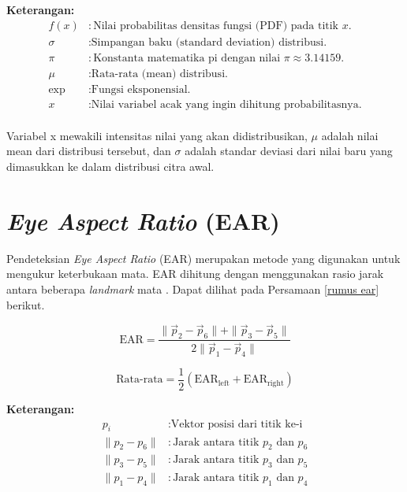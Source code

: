     \textbf{Keterangan:}
      \begin{align*}
        f(x) & : \text{Nilai probabilitas densitas fungsi (PDF) pada titik } x. \\
        \sigma & : \text{Simpangan baku (standard deviation) distribusi.} \\
        \pi & : \text{Konstanta matematika pi dengan nilai } \pi \approx 3.14159. \\
        \mu & : \text{Rata-rata (mean) distribusi.} \\
        \exp & : \text{Fungsi eksponensial.} \\
        x & : \text{Nilai variabel acak yang ingin dihitung probabilitasnya.} \\
    \end{align*}
    


    
    Variabel x mewakili intensitas nilai yang akan didistribusikan, $\mu$ adalah nilai mean dari distribusi tersebut, dan $\sigma$ adalah standar deviasi dari nilai baru yang dimasukkan ke dalam distribusi citra awal.



\section{\textit{Eye Aspect Ratio} (EAR)}

    Pendeteksian \textit{Eye Aspect Ratio }(EAR) merupakan metode yang digunakan untuk mengukur keterbukaan mata. EAR dihitung dengan menggunakan rasio jarak antara beberapa \textit{landmark} mata \cite{electronics11193183}. Dapat dilihat pada Persamaan \ref{rumus ear} berikut.

    
    \begin{equation}
    \label{rumus ear}
    \text{EAR} = \frac{{\| \vec{p}_2 - \vec{p}_6 \| + \| \vec{p}_3 - \vec{p}_5 \|}}{{2 \| \vec{p}_1 - \vec{p}_4 \|}}
    \end{equation}

    \begin{equation}
    \text{Rata-rata} = \frac{1}{2}(\text{EAR}_{\text{left}} + \text{EAR}_{\text{right}})
    \end{equation}



    \textbf{Keterangan:}
    \begin{align*}
        p_i & : \text{Vektor posisi dari titik ke-i}\\
        \|p_2 - p_6\| & : \text{Jarak antara titik $p_2$ dan $p_6$}\\
        \|p_3 - p_5\| & : \text{Jarak antara titik $p_3$ dan $p_5$}\\
        \|p_1 - p_4\| & : \text{Jarak antara titik $p_1$ dan $p_4$}\\
    \end{align*}

